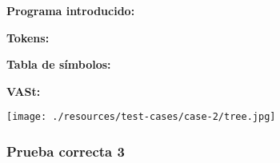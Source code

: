 \documentclass[11pt, , a4paper, titlepage]{article}
\newenvironment{changemargin}[2]{%
\begin{list}{}{%
\setlength{\topsep}{0pt}%
\setlength{\leftmargin}{#1}%
\setlength{\rightmargin}{#2}%
\setlength{\listparindent}{\parindent}%
\setlength{\itemindent}{\parindent}%
\setlength{\parsep}{\parskip}%
}%
\item[]}{\end{list}}
\begin{document}
\begin{changemargin}{+0.5cm}{+0cm}
    \vspace{1mm}                                                                 
    
    \textbf{Programa introducido:}
    \begin{changemargin}{+0.5cm}{+0cm}
        
    \end{changemargin}

    \vspace{2mm}                                                                 

    \textbf{Tokens:}
    \vspace{1mm}                                                                 
    \begin{changemargin}{+0.5cm}{+0cm}
    \end{changemargin}

    \vspace{3mm}                                                                 

    \textbf{Tabla de símbolos:}
    \vspace{1mm}                                                                 
    \begin{changemargin}{+0.5cm}{+0cm}
    \end{changemargin}

    \vspace{2mm}                                                                  

    \textbf{VASt:}
    \vspace{1mm} 
    \begin{center}
        \texttt{[image: ./resources/test-cases/case-2/tree.jpg]}
    \end{center}             

\end{changemargin}

\subsubsection{Prueba correcta 3}
\end{document}
